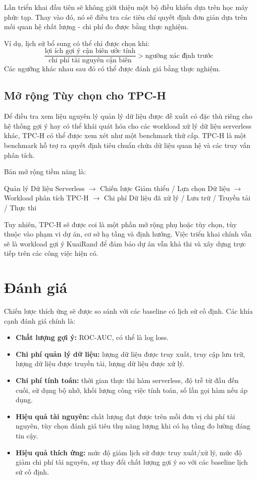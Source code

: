 \documentclass[12pt,a4paper]{article}
\begin{document}
Lần triển khai đầu tiên sẽ không giới thiệu một bộ điều khiển dựa trên học máy phức tạp. Thay vào đó, nó sẽ điều tra các tiêu chí quyết định đơn giản dựa trên mối quan hệ chất lượng - chi phí đo được bằng thực nghiệm.

Ví dụ, lịch sử bổ sung có thể chỉ được chọn khi:
\[ \frac{\text{lợi ích gợi ý cận biên ước tính}}{\text{chi phí tài nguyên cận biên}} > \text{ngưỡng xác định trước} \]
Các ngưỡng khác nhau sau đó có thể được đánh giá bằng thực nghiệm.

\subsection{Mở rộng Tùy chọn cho TPC-H}
Để điều tra xem liệu nguyên lý quản lý dữ liệu được đề xuất có đặc thù riêng cho hệ thống gợi ý hay có thể khái quát hóa cho các workload xử lý dữ liệu serverless khác, TPC-H có thể được xem xét như một benchmark thứ cấp. TPC-H là một benchmark hỗ trợ ra quyết định tiêu chuẩn chứa dữ liệu quan hệ và các truy vấn phân tích.

Bản mở rộng tiềm năng là:
\begin{center}
Quản lý Dữ liệu Serverless $\rightarrow$ Chiến lược Giảm thiểu / Lựa chọn Dữ liệu $\rightarrow$ Workload phân tích TPC-H $\rightarrow$ Chi phí Dữ liệu đã xử lý / Lưu trữ / Truyền tải / Thực thi
\end{center}

Tuy nhiên, TPC-H sẽ được coi là một phần mở rộng phụ hoặc tùy chọn, tùy thuộc vào phạm vi dự án, cơ sở hạ tầng và định hướng. Việc triển khai chính vẫn sẽ là workload gợi ý KuaiRand để đảm bảo dự án vẫn khả thi và xây dựng trực tiếp trên các công việc hiện có.

\section{Đánh giá}

Chiến lược thích ứng sẽ được so sánh với các baseline có lịch sử cố định. Các khía cạnh đánh giá chính là:

\begin{itemize}
    \item \textbf{Chất lượng gợi ý:} ROC-AUC, có thể là log loss.
    \item \textbf{Chi phí quản lý dữ liệu:} lượng dữ liệu được truy xuất, truy cập lưu trữ, lượng dữ liệu được truyền tải, lượng dữ liệu được xử lý.
    \item \textbf{Chi phí tính toán:} thời gian thực thi hàm serverless, độ trễ từ đầu đến cuối, sử dụng bộ nhớ, khối lượng công việc tính toán, số lần gọi hàm nếu áp dụng.
    \item \textbf{Hiệu quả tài nguyên:} chất lượng đạt được trên mỗi đơn vị chi phí tài nguyên, tùy chọn đánh giá tiêu thụ năng lượng khi có hạ tầng đo lường đáng tin cậy.
    \item \textbf{Hiệu quả thích ứng:} mức độ giảm lịch sử được truy xuất/xử lý, mức độ giảm chi phí tài nguyên, sự thay đổi chất lượng gợi ý so với các baseline lịch sử cố định.
\end{itemize}
\end{document}
